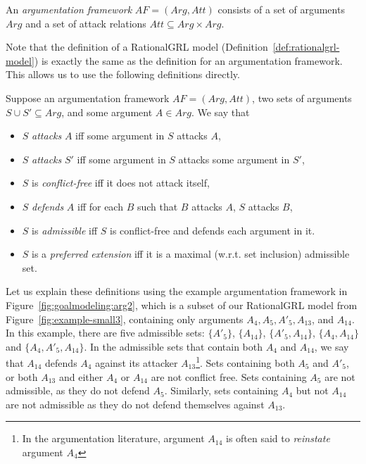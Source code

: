 \begin{definition}
\label{def:argumentation-framework}
An \emph{argumentation framework} $AF=(Arg,Att)$ consists of a set of arguments $Arg$ and a set of attack relations $Att\subseteq Arg\times Arg.$
\end{definition}

Note that the definition of a RationalGRL model (Definition~\ref{def:rationalgrl-model}) is exactly the same as the definition for an argumentation framework. This allows us to use the following definitions directly.

\begin{definition} \label{def:semantics}Suppose an argumentation framework $AF=(Arg,Att)$, two sets of arguments $S\cup S'\subseteq Arg$, and some argument $A\in Arg$. We say that
\begin{itemize}
\item $S$ \emph{attacks} $A$ iff some argument in $S$ attacks $A$,
\item $S$ \emph{attacks} $S'$ iff some argument in $S$ attacks some argument in $S'$,
\item $S$ is \emph{conflict-free} iff it does not attack itself,
\item $S$ \emph{defends} $A$ iff for each $B$ such that $B$ attacks $A$, $S$ attacks $B$,
\item $S$ is \emph{admissible} iff $S$ is conflict-free and defends each argument in it.
\item $S$ is a \emph{preferred extension} iff it is a maximal (w.r.t. set inclusion) admissible set.
\end{itemize}
\end{definition}

Let us explain these definitions using the example argumentation framework in Figure~\ref{fig:goalmodeling:arg2}, which is a subset of our RationalGRL model from Figure~\ref{fig:example-small3}, containing only arguments $A_4, A_{5},A'_{5},A_{13}$, and $A_{14}$. In this example, there are five admissible sets: $\{A'_{5}\}$, $\{A_{14}\}$, $\{A'_{5},A_{14}\}$, $\{A_4, A_{14}\}$ and $\{A_4, A'_5, A_{14}\}$. In the admissible sets that contain both $A_{4}$ and $A_{14}$, we say that $A_{14}$ defends $A_4$ against its attacker $A_{13}$\footnote{In the argumentation literature, argument $A_{14}$ is often said to \emph{reinstate} argument $A_{4}$}. Sets containing both $A_{5}$ and $A'_{5}$, or both $A_{13}$ and either $A_4$ or $A_{14}$ are not conflict free. Sets containing $A_5$ are not admissible, as they do not defend $A_5$. Similarly, sets containing $A_4$ but not $A_{14}$ are not admissible as they do not defend themselves against $A_{13}$. 

